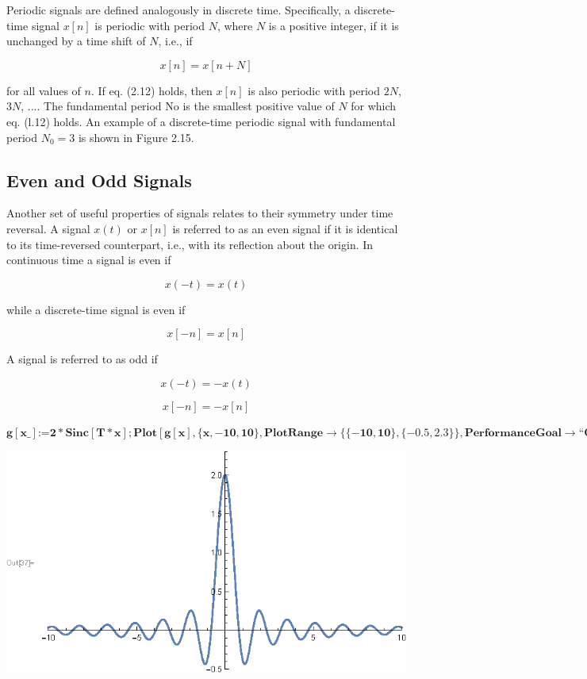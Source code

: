 \documentclass{report}
\begin{document}
Periodic signals are defined analogously in discrete time. Specifically, a discrete-time signal \(x[n]\) is periodic with period \(N\), where \(N\)
is a positive integer, if it is unchanged by a time shift of \(N\), i.e., if

\begin{equation}
x[n]=x[n+N]
\end{equation}

for all values of \(n\). If eq. (2.12) holds, then \(x[n]\) is also periodic with period \(2N\), \(3N\), .... The fundamental period No is the smallest
positive value of \(N\) for which eq. (l.12) holds. An example of a discrete-time periodic signal with fundamental period \(N_0 = 3\) is shown in
Figure 2.15.

\subsection*{Even and Odd Signals}

Another set of useful properties of signals relates to their symmetry under time reversal. A signal \(x(t)\) or \(x[n]\) is referred to as an even
signal if it is identical to its time-reversed counterpart, i.e., with its reflection about the origin. In continuous time a signal is even if

\begin{equation}
x(-t)=x(t)
\end{equation}

while a discrete-time signal is even if

\begin{equation}
x[-n]=x[n]
\end{equation}

A signal is referred to as odd if

\begin{equation}
x(-t)=-x(t)
\end{equation}

\begin{equation}
x[-n]=-x[n]
\end{equation}

\begin{doublespace}
\noindent\(\pmb{g[\text{x$\_$}]\text{:=}2*\text{Sinc}[T*x];\text{Plot}[g[x], \{x, -10,10\},\text{PlotRange}\to \{\{-10,10\},\{-0.5,2.3\}\},\text{PerformanceGoal}\to
\text{{``}Quality{''}}]}\)
\end{doublespace}

\includegraphics{GhassaneAniba_Signals_Systems_Oppenheim_Chap1_gr11.eps}
\end{document}
